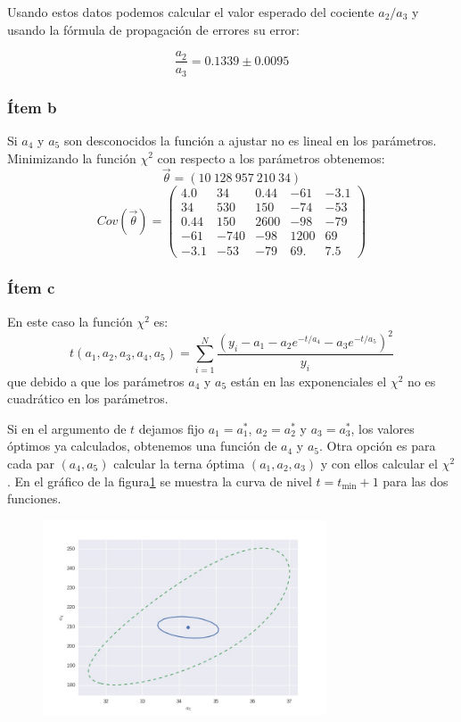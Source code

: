 Usando estos datos podemos calcular el valor esperado del cociente $a_2/a_3$ y usando la fórmula de propagación de errores su error:

$$
\frac{a_2}{a_3} = 0.1339 \pm 0.0095
$$

\subsubsection*{Ítem b}
Si $a_4$ y $a_5$ son desconocidos la función a ajustar no es lineal en los parámetros.
Minimizando la función $\chi^2$ con respecto a los parámetros obtenemos:
$$
\vec{\theta}=(10\ 128\ 957\  210\  34)
$$
$$
Cov(\vec{\theta}) = \left(
\begin{matrix}
4.0  & 34   &  0.44 & -61  & -3.1\\
34   & 530  & 150   & -74  & -53\\
0.44 & 150  & 2600  & -98  & -79\\
-61  & -740 & -98   & 1200 & 69\\
-3.1 & -53  & -79   & 69.  & 7.5
\end{matrix}
\right)
$$
\subsubsection*{Ítem c}
En este caso la función $\chi^2$ es:
$$
t(a_1, a_2, a_3, a_4, a_5) = \sum_{i=1}^N \frac{{\left(y_i-a_1 - a_2 e^{-t/a_4} - a_3 e^{-t/a_5}\right)}^2}{y_i}
$$
que debido a que los parámetros $a_4$ y $a_5$ están en las exponenciales el $\chi^2$ no es cuadrático en los parámetros.

Si en el argumento de $t$ dejamos fijo $a_1=a_1^*$, $a_2=a_2^*$ y $a_3=a_3^*$, los valores óptimos ya calculados, obtenemos una función de $a_4$ y $a_5$.
Otra opción es para cada par $(a_4, a_5)$ calcular la terna óptima $(a_1, a_2, a_3)$ y con ellos calcular el $\chi^2$.
En el gráfico de la figura\ref{fig:fig1} se muestra la curva de nivel $t=t_{\min} + 1$ para las dos funciones.

\begin{figure}
\centering
\includegraphics[width=0.75\textwidth]{fig1.jpg}
\caption[]{}
\label{fig:fig1}
\end{figure}


